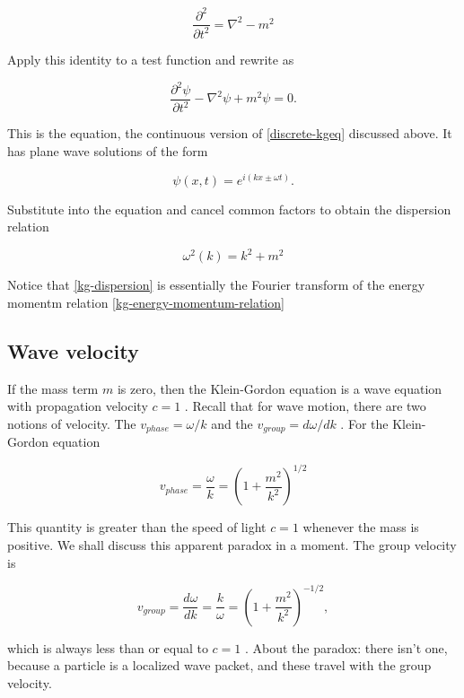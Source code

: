 \begin{equation}
\frac{\partial^2}{ \partial t^2} = \nabla^2 - m^2
\end{equation}


Apply  this  identity  to  a  test  function  and  rewrite  as



\begin{equation}
\label{kgeq}
\frac{\partial^2 \psi}{ \partial t^2} - \nabla^2\psi + m^2\psi = 0.
\end{equation}


This  is  the    equation,  the  continuous  version  of   \eqref{discrete-kgeq} discussed  above.   It  has  plane  wave  solutions  of  the
 form



\begin{equation}
\psi(x,t) = e^{i(kx \pm \omega t)}.
\end{equation}


Substitute  into  the  equation  and  cancel  common  factors  to  obtain  the
 dispersion  relation



\begin{equation}
\label{kg-dispersion}
\omega^2(k) = k^2 + m^2
\end{equation}


Notice  that   \eqref{kg-dispersion} is  essentially  the  Fourier  transform  of  the  energy  momentm  relation   \eqref{kg-energy-momentum-relation}

 \subsection{Wave  velocity}

If  the  mass  term   $m$  is  zero,  then  the  Klein-Gordon  equation  is  a  wave  equation  with  propagation  velocity   $c = 1$ .   Recall  that  for  wave  motion,  there  are  two  notions  of  velocity.   The     $v_{phase} = \omega/k$  and  the     $v_{group} = d\omega/dk$ .   For  the  Klein-Gordon  equation



\begin{equation}
v_{phase} = \frac{\omega}{k} = \left(1 + \frac{m^2}{ k^2} \right)^{1/2}
\end{equation}


This  quantity  is  greater  than  the  speed  of  light   $c = 1$  whenever  the  mass  is  positive.   We  shall  discuss  this  apparent  paradox  in  a  moment.   The  group  velocity
 is



\begin{equation}
v_{group} = \frac{d\omega}{dk} = \frac{k}{\omega} = \left(1 + \frac{m^2}{ k^2} \right)^{-1/2},
\end{equation}


which  is  always  less  than  or  equal  to   $c =1$ .   About  the  paradox:   there  isn't  one,  because  a  particle  is  a  localized  wave  packet,  and  these  travel  with  the  group  velocity.






